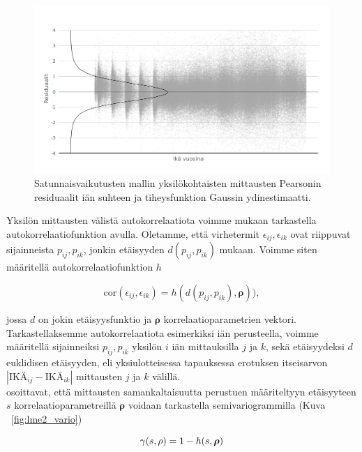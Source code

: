 \documentclass[finnish]{docopts}
\begin{document}
\begin{figure}[H]
\centering
  \includegraphics[scale=0.8]{kuvaajat/lme2_ika_residuaalit.png}
  \caption{Satunnaisvaikutusten mallin yksilökohtaisten mittausten Pearsonin residuaalit iän suhteen ja tiheysfunktion Gaussin ydinestimaatti.}
  \label{fig:lme2_ika_resid}
\end{figure}

Yksilön mittausten välistä autokorrelaatiota voimme \cite{pinheiro00} mukaan tarkastella autokorrelaatiofunktion avulla. Oletamme, että virhetermit $\epsilon_{ij}, \epsilon_{ik}$ ovat riippuvat sijainneista $p_{ij}, p_{ik}$, jonkin etäisyyden $d(p_{ij}, p_{ik})$ mukaan. Voimme siten määritellä autokorrelaatiofunktion $h$

$$
\text{cor}(\epsilon_{ij}, \epsilon_{ik}) = h(d(p_{ij}, p_{ik}), \bm{\rho})),
$$

jossa $d$ on jokin etäisyysfunktio ja $\bm{\rho}$ korrelaatioparametrien vektori.\\

Tarkastellaksemme autokorrelaatiota esimerkiksi iän perusteella, voimme määritellä sijainneiksi $p_{ij}, p_{ik}$ yksilön $i$ iän mittauksilla $j$ ja $k$, sekä etäisyydeksi $d$ euklidisen etäisyyden, eli yksiulotteisessa tapauksessa erotuksen itseisarvon $|\text{IKÄ}_{ij} - \text{IKÄ}_{ik}|$ mittausten $j$ ja $k$ välillä.\\ 

\cite{pinheiro00} osoittavat, että mittausten samankaltaisuutta perustuen määriteltyyn etäisyyteen $s$ korrelaatioparametreillä $\bm{\rho}$ voidaan tarkastella semivariogrammilla (Kuva ~\ref{fig:lme2_vario})

$$
\gamma(s, \rho) = 1 - h(s, \bm{\rho})\\
$$
\end{document}

